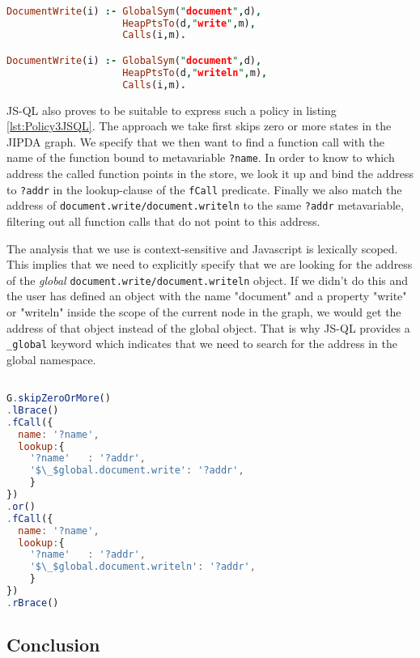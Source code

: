 \begin{lstlisting}[label={lst:Policy3GK},language=Prolog,caption=Policy 3 in GateKeeper,mathescape=true]  % float=t?

DocumentWrite(i) :- GlobalSym("document",d),
                    HeapPtsTo(d,"write",m),
                    Calls(i,m).

DocumentWrite(i) :- GlobalSym("document",d),
                    HeapPtsTo(d,"writeln",m),
                    Calls(i,m).
\end{lstlisting}

JS-QL also proves to be suitable to express such a policy in listing \ref{lst:Policy3JSQL}. The approach we take first skips zero or more states in the JIPDA graph. We specify that we then want to find a function call with the name of the function bound to metavariable \texttt{?name}. In order to know to which address the called function points in the store, we look it up and bind the address to \texttt{?addr} in the lookup-clause of the \texttt{fCall} predicate. Finally we also match the address of \texttt{document.write/document.writeln} to the same \texttt{?addr} metavariable, filtering out all function calls that do not point to this address.

The analysis that we use is context-sensitive and Javascript is lexically scoped. This implies that we need to explicitly specify that we are looking for the address of the \textit{global} \texttt{document.write/document.writeln} object. If we didn't do this and the user has defined an object with the name "document" and a property "write" or "writeln" inside the scope of the current node in the graph, we would get the address of that object instead of the global object. That is why JS-QL provides a \texttt{\_global} keyword which indicates that we need to search for the address in the global namespace. 

\begin{lstlisting}[label={lst:Policy3JSQL},language=JavaScript,caption=Policy 3 in JS-QL,mathescape=true]  % float=t?

G.skipZeroOrMore()
.lBrace()
.fCall({
  name: '?name',
  lookup:{
    '?name'   : '?addr',
    '$\_$global.document.write': '?addr',
    }
})
.or()
.fCall({
  name: '?name',
  lookup:{
    '?name'   : '?addr',
    '$\_$global.document.writeln': '?addr',
    }
})
.rBrace()
\end{lstlisting}


\subsection{Conclusion}

